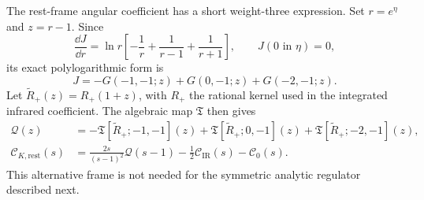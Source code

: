The rest-frame angular coefficient has a short weight-three expression.
Set $r=e^\eta$ and $z=r-1$. Since
\begin{equation}
 \frac{\dd J}{\dd r}=\ln r\left[-\frac1r+\frac1{r-1}+\frac1{r+1}\right],
 \qquad J(0\text{ in }\eta)=0,
\end{equation}
its exact polylogarithmic form is
\begin{equation}
 J=-G(-1,-1;z)+G(0,-1;z)+G(-2,-1;z).
\end{equation}
Let $\widetilde R_+(z)=R_+(1+z)$, with $R_+$ the rational kernel used
in the integrated infrared coefficient. The algebraic map $\mathfrak T$
then gives
\begin{align}
 \mathcal Q(z)&=-\mathfrak T[\widetilde R_+;-1,-1](z)
 +\mathfrak T[\widetilde R_+;0,-1](z)
 +\mathfrak T[\widetilde R_+;-2,-1](z),\\
 \mathcal C_{K,\mathrm{rest}}(s)
 &=\frac{2s}{(s-1)^2}\mathcal Q(s-1)
 -\frac12\mathcal C_{\mathrm{IR}}(s)-\mathcal C_0(s).
\end{align}
This alternative frame is not needed for the symmetric analytic
regulator described next.
